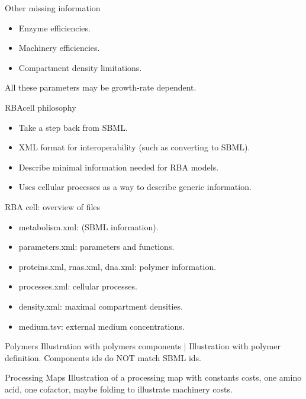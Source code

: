 \documentclass{beamer}
\begin{document}
\begin{frame}{Other missing information}
  \begin{itemize}
    \item Enzyme efficiencies.
    \item Machinery efficiencies.
    \item Compartment density limitations.
  \end{itemize}
  All these parameters may be growth-rate dependent.
\end{frame}

\begin{frame}{RBAcell philosophy}
  \begin{itemize}
    \item Take a step back from SBML.
    \item XML format for interoperability (such as converting to SBML).
    \item Describe minimal information needed for RBA models.
    \item Uses cellular processes as a way to describe generic information.
  \end{itemize}
\end{frame}

\begin{frame}{RBA cell: overview of files}
  \begin{itemize}
    \item metabolism.xml: (SBML information).
    \item parameters.xml: parameters and functions.
    \item proteins.xml, rnas.xml, dna.xml: polymer information.
    \item processes.xml: cellular processes.
    \item density.xml: maximal compartment densities.
    \item medium.tsv: external medium concentrations.
  \end{itemize}
\end{frame}

\begin{frame}{Polymers}
  Illustration with polymers components | Illustration with polymer definition.
  Components ids do NOT match SBML ids.
\end{frame}

\begin{frame}{Processing Maps}
  Illustration of a processing map with constants costs, one amino acid,
  one cofactor, maybe folding to illustrate machinery costs.
\end{frame}
\end{document}
